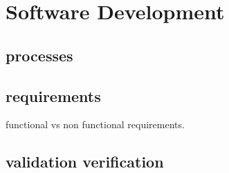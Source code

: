 \documentclass[\docroot/main]{subfiles}
\begin{document}
\chapter{Software Development}

\section{processes}


\section{requirements}

functional vs non functional requirements.

\section{validation verification}
\end{document}
